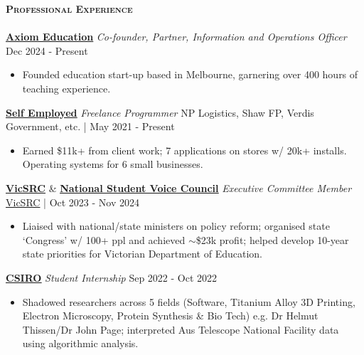 \documentclass[a4paper]{article}
\newcommand{\lineunder} {
    \vspace*{-8pt} \\
    \hspace*{-10pt} \hrulefill \\
}
\newcommand{\header} [1] {
    {\hspace*{-10pt}\vspace*{6pt} \large\textsc{\textbf{#1}}}
    \vspace*{-6pt} \lineunder
}
\begin{document}
\vspace*{1mm}
\header{Professional Experience}

\textbf{\href{https://axiomeducation.org/}{\ul{Axiom Education}}} \textit{Co-founder, Partner, Information and Operations Officer} \hfill Dec 2024 - Present\\
\vspace{-3.5mm}
\begin{itemize} \itemsep 0.5pt
\item Founded education start-up based in Melbourne, garnering over 400 hours of teaching experience.
\end{itemize}
\vspace{-2.5mm}

\textbf{\href{https://garv-shah.github.io/portfolio/}{\ul{Self Employed}}} \textit{Freelance Programmer} \hfill NP Logistics, Shaw FP, Verdis Government, etc. | May 2021 - Present\\
\vspace{-3.5mm}
\begin{itemize} \itemsep 0.5pt
\item Earned \$11k+ from client work; 7 applications on stores w/ 20k+ installs. Operating systems for 6 small businesses.
\end{itemize}
\vspace{-2.5mm}

\textbf{\href{https://vicsrc.org.au/about/executive-committee}{\ul{VicSRC}}} \& \textbf{\href{https://garv-shah.github.io/nsvc.pdf}{\ul{National Student Voice Council}}} \textit{Executive Committee Member} \hfill \href{https://vicsrc.org.au/}{VicSRC} | Oct 2023 - Nov 2024\\
\vspace{-3.5mm}
\begin{itemize} \itemsep 0.5pt
\item Liaised with national/state ministers on policy reform; organised state ‘Congress’ w/ 100+ ppl and achieved $\sim$\$23k profit; helped develop 10-year state priorities for Victorian Department of Education.
\end{itemize}
\vspace{-2.5mm}

\textbf{\href{https://www.csiro.au/en/}{\ul{CSIRO}}} \textit{Student Internship} \hfill Sep 2022 - Oct 2022\\
\vspace{-3.5mm}
\begin{itemize} \itemsep 0.5pt
\item Shadowed researchers across 5 fields (Software, Titanium Alloy 3D Printing, Electron Microscopy, Protein Synthesis \& Bio Tech) e.g. Dr Helmut Thissen/Dr John Page; interpreted Aus Telescope National Facility data using algorithmic analysis.
\end{itemize}
\vspace{-2.5mm}
\end{document}
